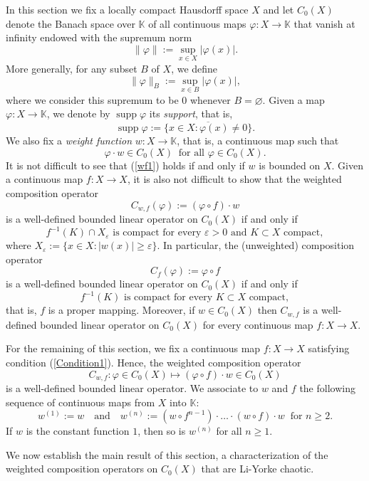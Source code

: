 \documentclass[12pt]{amsart}
\theoremstyle{theorem}
\theoremstyle{definition}
\theoremstyle{remark} \theoremstyle{question} \theoremstyle{example}
\newcommand{\K}{\mathbb{K}}
\newcommand{\supp}{\operatorname{supp}}
\newcommand{\eps}{\varepsilon}
\newcommand{\ov} {\overline}
\begin{document}
In this section we fix a locally compact Hausdorff space $X$ and let $C_0(X)$ denote the Banach space over $\K$ of all continuous maps 
$\varphi: X \to \K$ that vanish at infinity endowed with the supremum norm 
\[
\|\varphi\|\!:= \sup_{x \in X} |\varphi(x)|.
\]
More generally, for any subset $B$ of $X$, we define
\[
\|\varphi\|_B\!:= \sup_{x \in B} |\varphi(x)|,
\]
where we consider this supremum to be $0$ whenever $B = \varnothing$.
Given a map $\varphi : X \to \K$, we denote by $\supp \varphi$ its {\em support}, that is,
\[
\supp \varphi\!:= \ov{\{x \in X : \varphi(x) \neq 0\}}.
\]
We also fix a {\em weight function} $w : X \to \K$, that is, a continuous map such that
\begin{equation}\label{wf1}
\varphi \cdot w \in C_0(X) \ \text{ for all } \varphi \in C_0(X).
\end{equation}
It is not difficult to see that (\ref{wf1}) holds if and only if $w$ is bounded on $X$.
Given a continuous map $f : X \to X$, it is also not difficult to show that the weighted composition operator
\[
C_{w,f}(\varphi)\!:= (\varphi \circ f) \cdot w
\]
is a well-defined bounded linear operator on $C_0(X)$ if and only if
\begin{equation}\label{Condition1}
f^{-1}(K) \cap X_\eps \text{ is compact for every } \eps > 0 \text{ and } K \subset X \text{ compact}, 
\end{equation}
where $X_\eps\!:= \{x \in X : |w(x)| \geq \eps\}$. In particular, the (unweighted) composition operator
\[
C_f(\varphi)\!:= \varphi \circ f
\]
is a well-defined bounded linear operator on $C_0(X)$ if and only if 
\[
f^{-1}(K) \text{ is compact for every } K \subset X \text{ compact},
\]
that is, $f$ is a proper mapping.
Moreover, if $w \in C_0(X)$ then $C_{w,f}$ is a well-defined bounded linear operator on $C_0(X)$ for every continuous map $f : X \to X$.

\smallskip
For the remaining of this section, we fix a continuous map $f : X \to X$ satisfying condition (\ref{Condition1}). 
Hence, the weighted composition operator
\[
C_{w,f} : \varphi \in C_0(X) \mapsto (\varphi \circ f) \cdot w \in C_0(X)
\]
is a well-defined bounded linear operator. We associate to $w$ and $f$ the following sequence of continuous maps from $X$ into $\K$:
\[
w^{(1)}\!:= w \ \ \ \text{ and } \ \ \ w^{(n)}\!:= (w \circ f^{n-1}) \cdot\ldots\cdot (w \circ f) \cdot w \ \text{ for } n \geq 2.
\]
If $w$ is the constant function $1$, then so is $w^{(n)}$ for all $n \geq 1$.

\smallskip
We now establish the main result of this section, a characterization of the weighted composition operators on $C_0(X)$ that are Li-Yorke chaotic. 
\end{document}
